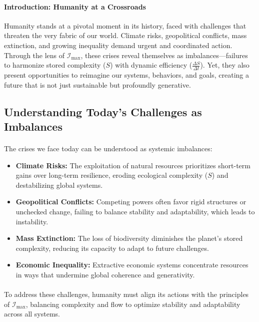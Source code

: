 \documentclass[12pt]{article}
\begin{document}
\paragraph{Introduction: Humanity at a Crossroads}
Humanity stands at a pivotal moment in its history, faced with challenges that threaten the very fabric of our world. Climate risks, geopolitical conflicts, mass extinction, and growing inequality demand urgent and coordinated action. Through the lens of \(\mathcal{I}_{\text{max}}\), these crises reveal themselves as imbalances—failures to harmonize stored complexity (\(S\)) with dynamic efficiency (\(\frac{\Delta S}{\Delta t}\)). Yet, they also present opportunities to reimagine our systems, behaviors, and goals, creating a future that is not just sustainable but profoundly generative.

\subsection{Understanding Today’s Challenges as Imbalances}
\paragraph{}
The crises we face today can be understood as systemic imbalances:
\begin{itemize}
    \item \textbf{Climate Risks:} The exploitation of natural resources prioritizes short-term gains over long-term resilience, eroding ecological complexity (\(S\)) and destabilizing global systems.
    \item \textbf{Geopolitical Conflicts:} Competing powers often favor rigid structures or unchecked change, failing to balance stability and adaptability, which leads to instability.
    \item \textbf{Mass Extinction:} The loss of biodiversity diminishes the planet’s stored complexity, reducing its capacity to adapt to future challenges.
    \item \textbf{Economic Inequality:} Extractive economic systems concentrate resources in ways that undermine global coherence and generativity.
\end{itemize}

\paragraph{}
To address these challenges, humanity must align its actions with the principles of \(\mathcal{I}_{\text{max}}\), balancing complexity and flow to optimize stability and adaptability across all systems.
\end{document}
